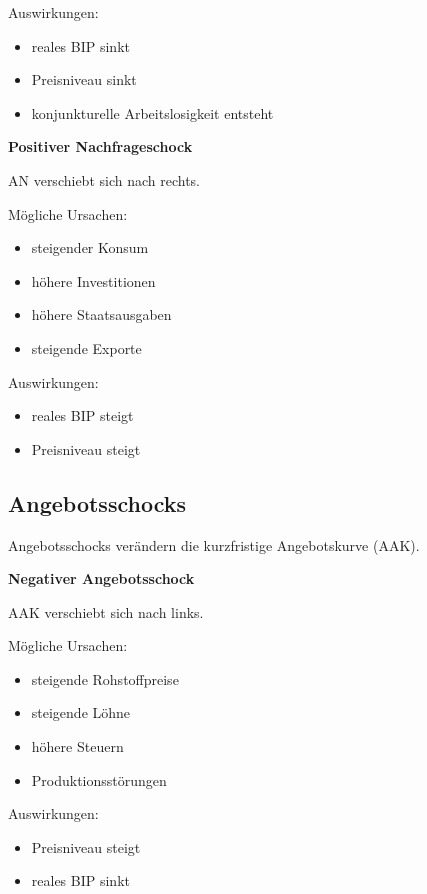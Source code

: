Auswirkungen:

\begin{itemize}
\item reales BIP sinkt
\item Preisniveau sinkt
\item konjunkturelle Arbeitslosigkeit entsteht
\end{itemize}

\textbf{Positiver Nachfrageschock}

AN verschiebt sich nach rechts.

Mögliche Ursachen:

\begin{itemize}
\item steigender Konsum
\item höhere Investitionen
\item höhere Staatsausgaben
\item steigende Exporte
\end{itemize}

Auswirkungen:

\begin{itemize}
\item reales BIP steigt
\item Preisniveau steigt
\end{itemize}


\subsection{Angebotsschocks}

Angebotsschocks verändern die kurzfristige Angebotskurve (AAK).

\textbf{Negativer Angebotsschock}

AAK verschiebt sich nach links.

Mögliche Ursachen:

\begin{itemize}
\item steigende Rohstoffpreise
\item steigende Löhne
\item höhere Steuern
\item Produktionsstörungen
\end{itemize}

Auswirkungen:

\begin{itemize}
\item Preisniveau steigt
\item reales BIP sinkt
\end{itemize}

